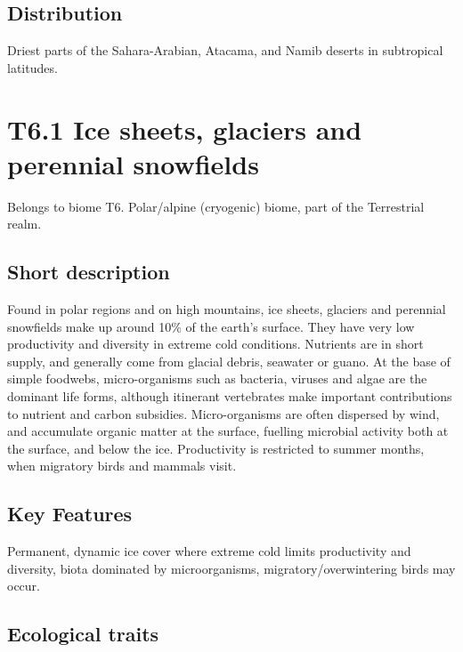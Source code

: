 \documentclass[
  letterpaper,
  DIV=11,
  numbers=noendperiod]{scrartcl}
\begin{document}
\subsection{Distribution}\label{distribution-92}

Driest parts of the Sahara-Arabian, Atacama, and Namib deserts in
subtropical latitudes.

\section{T6.1 Ice sheets, glaciers and perennial
snowfields}\label{t6.1-ice-sheets-glaciers-and-perennial-snowfields}

Belongs to biome T6. Polar/alpine (cryogenic) biome, part of the
Terrestrial realm.

\subsection{Short description}\label{short-description-93}

Found in polar regions and on high mountains, ice sheets, glaciers and
perennial snowfields make up around 10\% of the earth's surface. They
have very low productivity and diversity in extreme cold conditions.
Nutrients are in short supply, and generally come from glacial debris,
seawater or guano. At the base of simple foodwebs, micro-organisms such
as bacteria, viruses and algae are the dominant life forms, although
itinerant vertebrates make important contributions to nutrient and
carbon subsidies. Micro-organisms are often dispersed by wind, and
accumulate organic matter at the surface, fuelling microbial activity
both at the surface, and below the ice. Productivity is restricted to
summer months, when migratory birds and mammals visit.

\subsection{Key Features}\label{key-features-93}

Permanent, dynamic ice cover where extreme cold limits productivity and
diversity, biota dominated by microorganisms, migratory/overwintering
birds may occur.

\subsection{Ecological traits}\label{ecological-traits-93}
\end{document}
